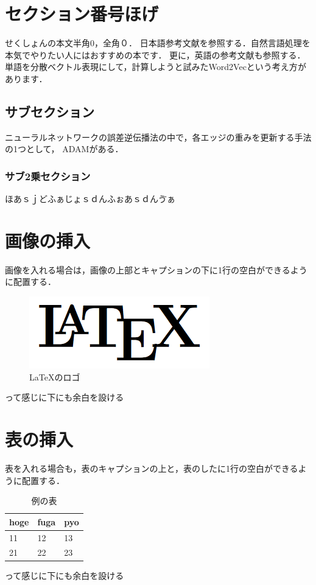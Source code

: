 \documentclass[10pt, a4j, uplatex, twocolumn]{jsarticle}
\begin{document}


\section{セクション番号ほげ}
せくしょんの本文半角0，全角０．
日本語参考文献を参照する．自然言語処理を本気でやりたい人にはおすすめの本\cite{Natural_Language_Processing_by_Deep_Learning}です．
更に，英語の参考文献も参照する．単語を分散ベクトル表現にして，計算しようと試みたWord2Vecという考え方\cite{Mikolov_word2vec}があります．
\subsection{サブセクション}
ニューラルネットワークの誤差逆伝播法の中で，各エッジの重みを更新する手法の1つとして，
ADAM\cite{ADAM}がある．

\subsubsection{サブ2乗セクション}
ほあｓｊどふぁじょｓｄんふぉあｓｄんゔぁ

\section{画像の挿入}
画像を入れる場合は，画像の上部とキャプションの下に1行の空白ができるように配置する．
\begin{figure}[H]
    \centering
    \includegraphics[width=0.8\linewidth]{latex-logo.png}
    \caption{LaTeXのロゴ}
    \label{fig:latex}
\end{figure}
って感じに下にも余白を設ける

\section{表の挿入}
\lipsum[1]
表を入れる場合も，表のキャプションの上と，表のしたに1行の空白ができるように配置する．
\begin{table}[H]
\centering
\caption{例の表}
\label{tab:example}
\begin{tabular}{@{}lll@{}}
\toprule
hoge & fuga & pyo \\
\midrule
11   & 12   & 13  \\
21   & 22   & 23 \\
\bottomrule
\end{tabular}
\end{table}
って感じに下にも余白を設ける



\end{document}
